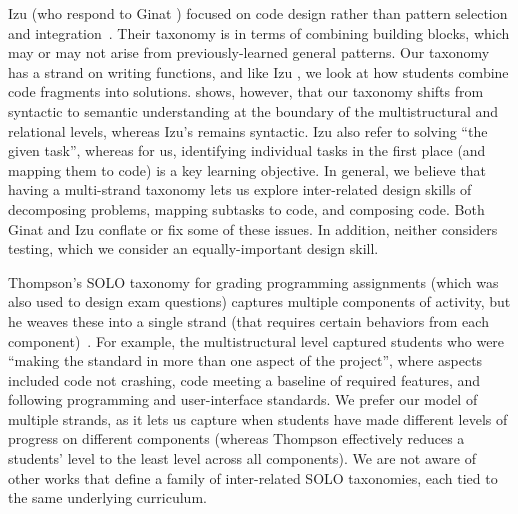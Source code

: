 Izu \etal (who respond to Ginat \etal) focused on code design
rather than pattern selection and
integration~\cite{izu-code-design-solo16}.  Their taxonomy is in terms
of combining building blocks, which may or may not arise from
previously-learned general patterns.  Our taxonomy has a strand on
writing functions, and like Izu \etal, we look at how students
combine code fragments into solutions.   shows,
however, that our taxonomy shifts from syntactic to semantic understanding
at the boundary of the multistructural and relational levels, whereas
Izu's remains syntactic.  Izu \etal also refer to solving ``the given
task'', whereas for us, identifying individual tasks in the first
place (and mapping them to code) is a key learning objective.  In
general, we believe that having a multi-strand taxonomy lets us
explore inter-related design skills of decomposing problems, mapping
subtasks to code, and composing code.  Both Ginat and Izu conflate or
fix some of these issues.  In addition, neither considers testing,
which we consider an equally-important design skill.

Thompson's SOLO taxonomy for grading programming assignments
(which was also used to design exam questions)
captures multiple
components of activity, but he weaves these into a single strand (that
requires certain behaviors from each
component)~\cite{thompson_holistic_2007}.  For example, the
multistructural level captured students who were ``making the standard
in more than one aspect of the project'', where aspects included code
not crashing, code meeting a baseline of required features, and
following programming and user-interface standards.
We prefer our model
of multiple strands, as it lets us capture when students have made
different levels of progress on different components (whereas Thompson
effectively reduces a students' level to the least level across all
components).
We are not aware of other works that define a family of
inter-related SOLO taxonomies, each tied to the same underlying curriculum.

